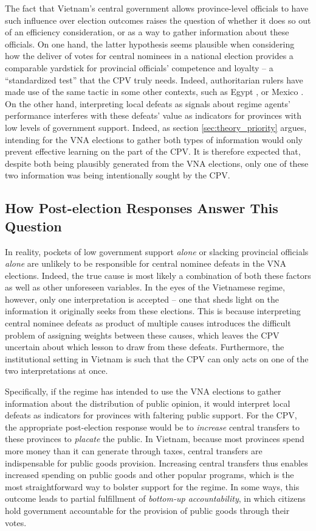 \documentclass[12pt]{article}
\newcommand{\1}{\mathbbm{1}}
\begin{document}
The fact that Vietnam's central government allows province-level officials to have such influence over election outcomes raises the question of whether it does so out of an efficiency consideration, or as a way to gather information about these officials. On one hand, the latter hypothesis seems plausible when considering how the deliver of votes for central nominees in a national election provides a comparable yardstick for provincial officials' competence and loyalty -- a ``standardized test'' that the CPV truly needs. Indeed, authoritarian rulers have made use of the same tactic in some other contexts, such as Egypt \citep{Blaydes2008}, or Mexico \citep{Magaloni2006, Larreguy2016}. On the other hand, interpreting local defeats as signals about regime agents' performance interferes with these defeats' value as indicators for provinces with low levels of government support. Indeed, as section \ref{sec:theory_priority} argues, intending for the VNA elections to gather both types of information would only prevent effective learning on the part of the CPV. It is therefore expected that, despite both being plausibly generated from the VNA elections, only one of these two information was being intentionally sought by the CPV.


\subsection{How Post-election Responses Answer This Question}
\label{sec:vietnam_responses}

In reality, pockets of low government support \textit{alone} or slacking provincial officials \textit{alone} are unlikely to be responsible for central nominee defeats in the VNA elections. Indeed, the true cause is most likely a combination of both these factors as well as other unforeseen variables. In the eyes of the Vietnamese regime, however, only one interpretation is accepted -- one that sheds light on the information it originally seeks from these elections. This is because interpreting central nominee defeats as product of multiple causes introduces the difficult problem of assigning weights between these causes, which leaves the CPV uncertain about which lesson to draw from these defeats. Furthermore, the institutional setting in Vietnam is such that the CPV can only acts on one of the two interpretations at once. 

Specifically, if the regime has intended to use the VNA elections to gather information about the distribution of public opinion, it would interpret local defeats as indicators for provinces with faltering public support. For the CPV, the appropriate post-election response would be to  \textit{increase} central transfers to these provinces to \textit{placate} the public. In Vietnam, because most provinces spend more money than it can generate through taxes, central transfers are indispensable for public goods provision. Increasing central transfers thus enables increased spending on public goods and other popular programs, which is the most straightforward way to bolster support for the regime. In some ways, this outcome leads to partial fulfillment of \textit{bottom-up accountability}, in which citizens hold government accountable for the provision of public goods through their votes.
\end{document}

